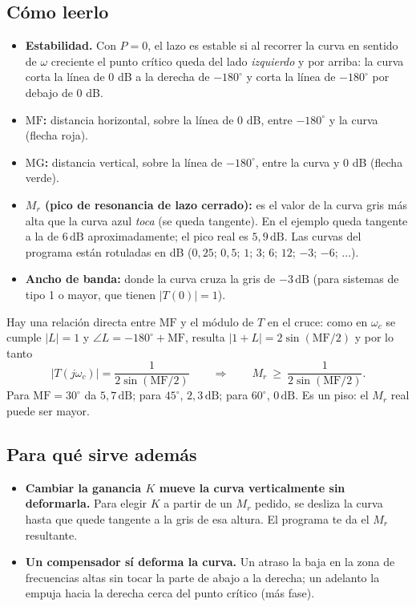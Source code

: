 \documentclass[11pt,a4paper]{article}
\newcommand{\dB}{\,\mathrm{dB}}
\newcommand{\wc}{\omega_c}
\newcommand{\MF}{\mathrm{MF}}
\newcommand{\MG}{\mathrm{MG}}
\newcommand{\Mr}{M_r}
\begin{document}
\subsection{Cómo leerlo}
\begin{itemize}
\item \textbf{Estabilidad.} Con $P=0$, el lazo es estable si al recorrer la curva en sentido de $\omega$ creciente el
 punto crítico queda del lado \emph{izquierdo} y por arriba: la curva corta la línea de 0 dB a la derecha de $-180^\circ$ y
 corta la línea de $-180^\circ$ por debajo de 0 dB.
\item \textbf{$\MF$:} distancia horizontal, sobre la línea de 0 dB, entre $-180^\circ$ y la curva (flecha roja).
\item \textbf{$\MG$:} distancia vertical, sobre la línea de $-180^\circ$, entre la curva y 0 dB (flecha verde).
\item \textbf{$\Mr$ (pico de resonancia de lazo cerrado):} es el valor de la curva gris más alta que la curva azul
 \emph{toca} (se queda tangente). En el ejemplo queda tangente a la de $6\dB$ aproximadamente; el pico real es
 $5{,}9\dB$. Las curvas del programa están rotuladas en dB ($0{,}25$; $0{,}5$; $1$; $3$; $6$; $12$; $-3$; $-6$; $\dots$).
\item \textbf{Ancho de banda:} donde la curva cruza la gris de $-3\dB$ (para sistemas de tipo 1 o mayor, que tienen
 $|T(0)|=1$).
\end{itemize}

\begin{regla}
Hay una relación directa entre $\MF$ y el módulo de $T$ en el cruce: como en $\wc$ se cumple $|L|=1$ y $\angle L=-180^\circ+\MF$,
resulta $|1+L|=2\sin(\MF/2)$ y por lo tanto
\[
|T(j\wc)|=\frac{1}{2\sin(\MF/2)}\qquad\Longrightarrow\qquad \Mr\ \ge\ \frac{1}{2\sin(\MF/2)} .
\]
Para $\MF=30^\circ$ da $5{,}7\dB$; para $45^\circ$, $2{,}3\dB$; para $60^\circ$, $0\dB$. Es un piso: el $\Mr$ real puede ser mayor.
\end{regla}

\subsection{Para qué sirve además}
\begin{itemize}
\item \textbf{Cambiar la ganancia $K$ mueve la curva verticalmente sin deformarla.} Para elegir $K$ a partir de un $\Mr$
 pedido, se desliza la curva hasta que quede tangente a la gris de esa altura. El programa te da el $\Mr$ resultante.
\item \textbf{Un compensador sí deforma la curva.} Un atraso la baja en la zona de frecuencias altas sin tocar la parte de
 abajo a la derecha; un adelanto la empuja hacia la derecha cerca del punto crítico (más fase).
\end{itemize}
\end{document}
